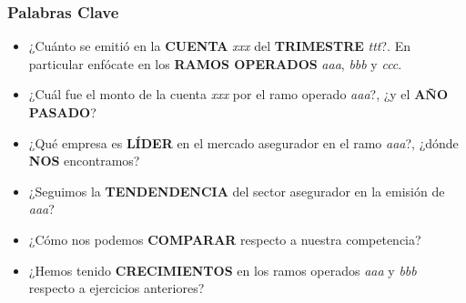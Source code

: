 \begin{frame}
    \frametitle{Palabras Clave}
    \begin{itemize}
        \item<1-> ¿Cuánto se emitió en la \textbf{CUENTA} \textit{xxx} del \textbf{TRIMESTRE} \textit{ttt}?. En particular enfócate en los \textbf{RAMOS OPERADOS} \textit{aaa}, \textit{bbb} y \textit{ccc}.
        \item<1-> ¿Cuál fue el monto de la cuenta \textit{xxx} por el ramo operado \textit{aaa}?, ¿y el \textbf{AÑO PASADO}?
        \item<1-> ¿Qué empresa es \textbf{LÍDER} en el mercado asegurador en el ramo \textit{aaa}?, ¿dónde \textbf{NOS} encontramos?
        \item<2-> ¿Seguimos la \textbf{TENDENDENCIA} del sector asegurador en la emisión de \textit{aaa}?
        \item<2-> ¿Cómo nos podemos \textbf{COMPARAR} respecto a nuestra competencia?
        \item<3-> ¿Hemos tenido \textbf{CRECIMIENTOS} en los ramos operados \textit{aaa} y \textit{bbb} respecto a ejercicios anteriores?
  \end{itemize}
\end{frame}